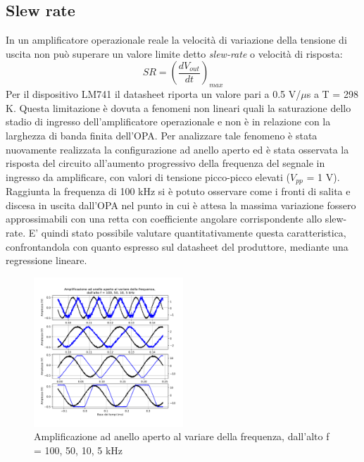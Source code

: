 \documentclass[journal]{IEEEtran}
\begin{document}
\subsection{\textbf{Slew rate}}
In un amplificatore operazionale reale la velocità di variazione della tensione di uscita non può superare un valore limite detto \textit{slew-rate} o velocità di risposta:
\begin{equation}
    SR = (\frac{dV_{out}}{dt})_{max}
\end{equation}
Per il dispositivo LM741 il datasheet riporta un valore pari a 0.5 V/$\mu$s a T = 298 K.
Questa limitazione è dovuta a fenomeni non lineari quali la saturazione dello stadio di ingresso dell'amplificatore operazionale e non è in relazione con la larghezza di banda finita dell'OPA. 
Per analizzare tale fenomeno è stata nuovamente realizzata la configurazione ad anello aperto ed è stata osservata la risposta del circuito all'aumento progressivo della frequenza del segnale in ingresso da amplificare, con valori di tensione picco-picco elevati ($V_{pp}$ = 1 V). Raggiunta la frequenza di 100 kHz si è potuto osservare come i fronti di salita e discesa in uscita dall'OPA nel punto in cui è attesa la massima variazione fossero approssimabili con una retta con coefficiente angolare corrispondente allo slew-rate. E' quindi stato possibile valutare quantitativamente questa caratteristica, confrontandola con quanto espresso sul datasheet del produttore, mediante una regressione lineare.
\begin{figure}[H]%
\begin {center}
\includegraphics[width=0.50\textwidth]{analysis/output/OPA-open-loop-slew-rate.pdf}
\caption{Amplificazione ad anello aperto al variare della frequenza, dall'alto f = 100, 50, 10, 5 kHz}
\label{fig:slew-rate-table}
\end {center}
\end{figure}
\end{document}
